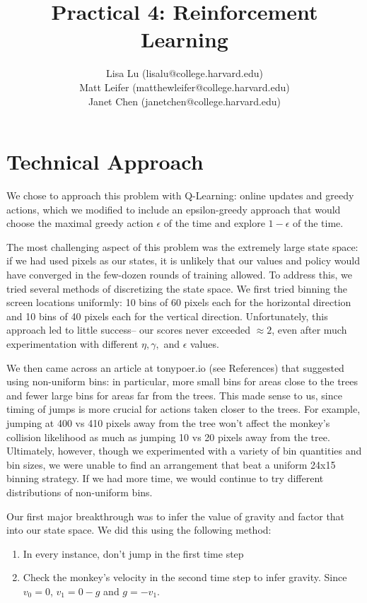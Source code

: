 \documentclass[11pt]{article}
\title{Practical 4: Reinforcement Learning}
\author{Lisa Lu (lisalu@college.harvard.edu) \\ Matt Leifer (matthewleifer@college.harvard.edu) \\ Janet Chen (janetchen@college.harvard.edu) }
\begin{document}
\maketitle
\section{Technical Approach}

We chose to approach this problem with Q-Learning: online updates and greedy actions, which we modified to include an epsilon-greedy approach that would choose the maximal greedy action $\epsilon$ of the time and explore $1-\epsilon$ of the time.

The most challenging aspect of this problem was the extremely large state space: if we had used pixels as our states, it is unlikely that our values and policy would have converged in the few-dozen rounds of training allowed. To address this, we tried several methods of discretizing the state space. We first tried binning the screen locations uniformly: 10 bins of 60 pixels each for the horizontal direction and 10 bins of 40 pixels each for the vertical direction. Unfortunately, this approach led to little success-- our scores never exceeded $\approx2$, even after much experimentation with different $\eta, \gamma,$ and $\epsilon$ values. 

We then came across an article at tonypoer.io (see References) that suggested using non-uniform bins: in particular, more small bins for areas close to the trees and fewer large bins for areas far from the trees. This made sense to us, since timing of jumps is more crucial for actions taken closer to the trees. For example, jumping at 400 vs 410 pixels away from the tree won't affect the monkey's collision likelihood as much as jumping 10 vs 20 pixels away from the tree. Ultimately, however, though we experimented with a variety of bin quantities and bin sizes, we were unable to find an arrangement that beat a uniform 24x15 binning strategy. If we had more time, we would continue to try different distributions of non-uniform bins. 

Our first major breakthrough was to infer the value of gravity and factor that into our state space. We did this using the following method:
\begin{enumerate}
	\item In every instance, don't jump in the first time step
	\item Check the monkey's velocity in the second time step to infer gravity. Since $v_0 = 0$, $v_1 = 0 - g$ and $g = - v_1$.
\end{enumerate}
\end{document}
